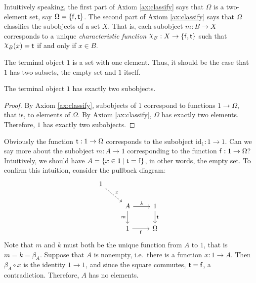 Intuitively speaking, the first part of Axiom \ref{ax:classify} says
that $\Omega$ is a two-element set, say $\Omega = \{ \mathsf{f},\mathsf{t}\}$.  The
second part of Axiom \ref{ax:classify} says that $\Omega$ classifies
the subobjects of a set $X$.  That is, each subobject $m:B\to X$
corresponds to a unique \emph{characteristic function} $\ch{B}:X\to
\{\f,\tr\}$ such that $\ch{B}(x)=\tr$ if and only if $x\in B$.

The terminal object $1$ is a set with one element.  Thus, it should be
the case that $1$ has two subsets, the empty set and $1$ itself.

\begin{prop} The terminal object $1$ has exactly two
  subobjects.  \label{sub-one} \end{prop}

\begin{proof} By Axiom \ref{ax:classify}, subobjects of $1$ correspond
  to functions $1\to\Omega$, that is, to elements of $\Omega$.  By
  Axiom \ref{ax:classify}, $\Omega$ has exactly two elements.
  Therefore, $1$ has exactly two subobjects. \end{proof}

Obviously the function $\mathsf{t}:1\to\Omega$ corresponds to the subobject
$\mathrm{id}_1:1\to 1$.  Can we say more about the subobject $m:A\to1$
corresponding to the function $\mathsf{f}:1\to \Omega$?  Intuitively, we
should have $A=\{ x\in 1\mid \mathsf{t} = \mathsf{f}\}$, in other words, the empty
set.  To confirm this intuition, consider the pullback diagram:
\[ \begin{tikzcd}
1 \arrow[dashed,dr,"x"] \\ 
&   A \arrow[d,"m"'] \arrow[r,"k"] & 1 \arrow[d,"\tr"] \\
&   1 \arrow[r,"\f"'] & \Omega
\end{tikzcd} \] Note that $m$ and $k$ must both be the unique function
from $A$ to $1$, that is $m=k=\beta _A$.  Suppose that $A$ is
nonempty, i.e.\ there is a function $x:1\to A$.  Then $\beta _A\circ
x$ is the identity $1\to 1$, and since the square commutes, $\mathsf{t} =\mathsf{f}$,
a contradiction.  Therefore, $A$ has no elements.


